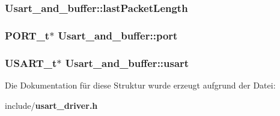 \subsubsection[{lastPacketLength}]{ {\bf Usart\_\-and\_\-buffer::lastPacketLength}}\label{struct_usart__and__buffer_aae7f08fec7179020a64f88f37ae702e4}
\subsubsection[{port}]{\setlength{\rightskip}{0pt plus 5cm}PORT\_\-t$\ast$ {\bf Usart\_\-and\_\-buffer::port}}\label{struct_usart__and__buffer_a2b5afe7ca3c4e5e7868c3612715eb0ea}
\subsubsection[{usart}]{\setlength{\rightskip}{0pt plus 5cm}USART\_\-t$\ast$ {\bf Usart\_\-and\_\-buffer::usart}}\label{struct_usart__and__buffer_a278d0069e61a75fa9cde6b1149c35808}


Die Dokumentation für diese Struktur wurde erzeugt aufgrund der Datei:\begin{DoxyCompactItemize}
\item 
include/{\bf usart\_\-driver.h}\end{DoxyCompactItemize}
